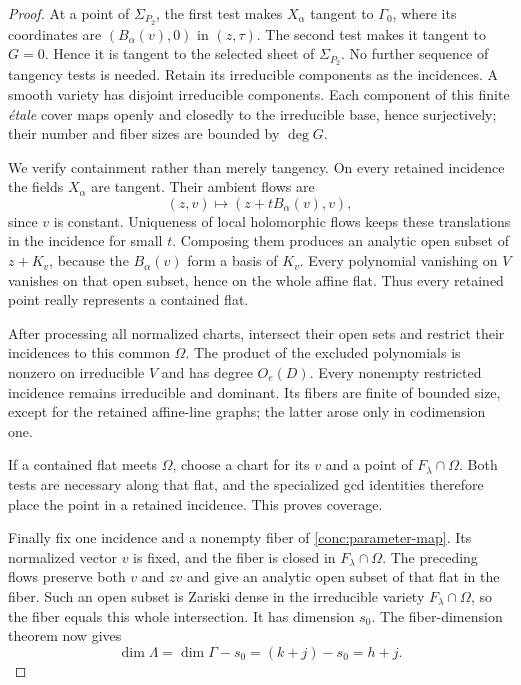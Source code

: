 \begin{proof}
At a point of $\Sigma_{P_2}$, the first test makes $X_\alpha$ tangent
to $\Gamma_0$, where its coordinates are $(B_\alpha(v),0)$ in
$(z,\tau)$.  The second test makes it tangent to $G=0$.  Hence it is
tangent to the selected sheet of $\Sigma_{P_2}$.  No further
sequence of tangency tests is needed.  Retain its irreducible
components as the incidences.  A smooth variety has disjoint
irreducible components.  Each component of this finite \emph{\'etale}
cover maps openly and closedly to the irreducible base, hence
surjectively; their number and fiber sizes are bounded by $\deg G$.

We verify containment rather than merely tangency.  On every retained
incidence the fields $X_\alpha$ are tangent.  Their ambient flows are
\[
 (z,v)\longmapsto(z+tB_\alpha(v),v),
\]
since $v$ is constant.  Uniqueness of local holomorphic flows keeps
these translations in the incidence for small $t$.  Composing them
produces an analytic open subset of $z+K_v$, because the $B_\alpha(v)$
form a basis of $K_v$.  Every polynomial vanishing on $V$ vanishes on
that open subset, hence on the whole affine flat.  Thus every retained
point really represents a contained flat.

After processing all normalized charts, intersect their open sets and
restrict their incidences to this common $\Omega$.  The product of
the excluded polynomials is nonzero on irreducible $V$ and has degree
$O_e(D)$.  Every nonempty restricted incidence remains irreducible and
dominant.  Its fibers are finite of bounded size, except for the
retained affine-line graphs; the latter arose only in codimension one.

If a contained flat meets $\Omega$, choose a chart for its $v$ and a
point of $F_\lambda\cap\Omega$.  Both tests are necessary along that
flat, and the specialized gcd identities therefore place the point in
a retained incidence.  This proves coverage.

Finally fix one incidence and a nonempty fiber of
\eqref{conc:parameter-map}.  Its normalized vector $v$ is fixed, and
the fiber is closed in $F_\lambda\cap\Omega$.  The preceding flows
preserve both $v$ and $zv$ and give an analytic open subset of that
flat in the fiber.  Such an open subset is Zariski dense in the
irreducible variety $F_\lambda\cap\Omega$, so the fiber equals this
whole intersection.  It has dimension $s_0$.  The fiber-dimension
theorem now gives
\[
 \dim\Lambda=\dim\Gamma-s_0=(k+j)-s_0=h+j.
\]
\end{proof}

